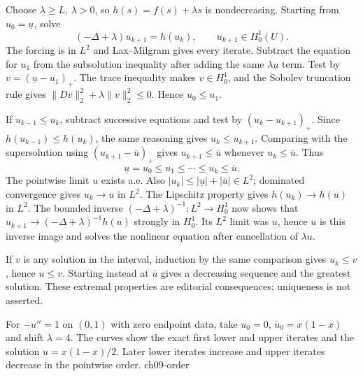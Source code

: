 \begin{expandedproof}
Choose $\lambda\geq L$, $\lambda>0$, so $h(s)=f(s)+\lambda s$ is
nondecreasing. Starting from $u_0=\underline u$, solve
\begin{equation}\label{eq:9-order-iteration}
 (-\Delta+\lambda)u_{k+1}=h(u_k),\qquad u_{k+1}\in H^1_0(U).
\end{equation}
The forcing is in $L^2$ and Lax--Milgram gives every iterate.
Subtract the equation for $u_1$ from the subsolution inequality after
adding the same $\lambda\underline u$ term. Test by
$v=(\underline u-u_1)_+$. The trace inequality makes $v\in H^1_0$,
and the Sobolev truncation rule gives
$\|Dv\|_2^2+\lambda\|v\|_2^2\leq0$. Hence $u_0\leq u_1$.

If $u_{k-1}\leq u_k$, subtract successive equations and test by
$(u_k-u_{k+1})_+$. Since $h(u_{k-1})\leq h(u_k)$, the same reasoning
gives $u_k\leq u_{k+1}$. Comparing with the supersolution using
$(u_{k+1}-\overline u)_+$ gives $u_{k+1}\leq\overline u$ whenever
$u_k\leq\overline u$. Thus
\[
 \underline u=u_0\leq u_1\leq\cdots\leq u_k\leq\overline u.
\]
The pointwise limit $u$ exists a.e. Also
$|u_k|\leq|\underline u|+|\overline u|\in L^2$; dominated convergence
gives $u_k\to u$ in $L^2$. The Lipschitz property gives
$h(u_k)\to h(u)$ in $L^2$. The bounded inverse
$(-\Delta+\lambda)^{-1}:L^2\to H^1_0$ now shows that
$u_{k+1}\to(-\Delta+\lambda)^{-1}h(u)$ strongly in $H^1_0$.
Its $L^2$ limit was $u$, hence $u$ is this inverse image and solves
the nonlinear equation after cancellation of $\lambda u$.

If $v$ is any solution in the interval, induction by the same comparison
gives $u_k\leq v$, hence $u\leq v$. Starting instead at $\overline u$
gives a decreasing sequence and the greatest solution. These extremal
properties are editorial consequences; uniqueness is not asserted.
\end{expandedproof}
\Needspace{42mm}
{For $-u''=1$ on $(0,1)$ with zero endpoint data, take $u_0=0$, $\overline u_0=x(1-x)$ and shift $\lambda=4$. The curves show the exact first lower and upper iterates and the solution $u=x(1-x)/2$. Later lower iterates increase and upper iterates decrease in the pointwise order.}
{ch09-order}
\Needspace{40mm}
